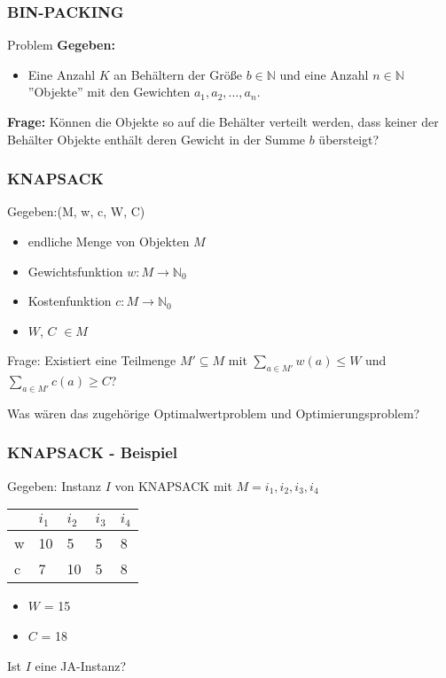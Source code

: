 \documentclass{beamer}
\begin{document}
{\begin{frame}
\frametitle{BIN-PACKING}
\begin{block}{Problem}
\textbf{Gegeben:}
\begin{itemize}
 \item Eine Anzahl $K$ an Behältern der Größe $b \in \mathbb{N}$ und eine Anzahl $n \in \mathbb{N}$ ''Objekte'' mit den Gewichten $a_1, a_2,\ldots,a_n$.
\end{itemize}
\textbf{Frage:}
Können die Objekte so auf die Behälter verteilt werden, dass keiner der Behälter Objekte enthält deren Gewicht in der Summe $b$ übersteigt?
\end{block}
\end{frame}

\begin{frame}
 \frametitle{KNAPSACK}
 Gegeben:(M, w, c, W, C)
 \begin{itemize}
  \item endliche Menge von Objekten $M$
  \item Gewichtsfunktion $w:M \rightarrow \mathbb{N}_0$
  \item Kostenfunktion $c:M \rightarrow \mathbb{N}_0$
  \item $W$, $C$ $\in M$
 \end{itemize}
Frage: Existiert eine Teilmenge $M' \subseteq M$ mit $\sum_{a\in M'} w(a) \leq W$ und $\sum_{a\in  M'} c(a) \geq C$?
\pause

Was wären das zugehörige Optimalwertproblem und Optimierungsproblem?
\end{frame}

\begin{frame}
 \frametitle{KNAPSACK - Beispiel}
 Gegeben: Instanz $I$ von KNAPSACK mit $M = {i_1, i_2, i_3, i_4}$
  \begin{center}
\begin{tabular}{l|l|l|l|l}
	  &$i_1$ &$i_2$ &$i_3$ 	&$i_4$\\
  \hline
	w &10	 &5	&5	&8\\
  \hline
	c &7	 &10	&5	&8\\	
\end{tabular}
\end{center}
\begin{itemize}
 \item $W$ = 15
 \item $C$ = 18
\end{itemize}
Ist $I$ eine JA-Instanz?
\end{frame}

}
\end{document}
